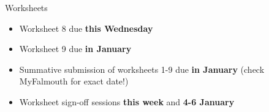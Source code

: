 \begin{frame}{Worksheets}
	\begin{itemize}
		\item Worksheet 8 due \textbf{this Wednesday}
		\item Worksheet 9 due \textbf{in January}
		\item Summative submission of worksheets 1-9 due \textbf{in January} (check MyFalmouth for exact date!)
		\item Worksheet sign-off sessions \textbf{this week} and \textbf{4-6 January}
	\end{itemize}
\end{frame}
